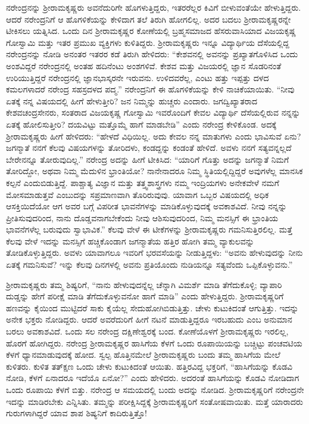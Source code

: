 ನರೇಂದ್ರನನ್ನು ಶ‍್ರೀರಾಮಕೃಷ್ಣರು ಅವನೆದುರಿಗೇ ಹೊಗಳುತ್ತಿದ್ದರು, ಇತರರೆಲ್ಲರ ಕಿವಿಗೆ ಬೀಳುವಂತೆಯೇ ಹೇಳುತ್ತಿದ್ದರು. ಆದರೆ ನರೇಂದ್ರನಿಗೆ ಆ ಹೊಗಳಿಕೆಯನ್ನು ಕೇಳಿದಾಗ ತಲೆ ತಿರುಗಿ ಹೋಗಲಿಲ್ಲ. ಅದರ ಬದಲು ಶ‍್ರೀರಾಮಕೃಷ್ಣರನ್ನೇ ಟೀಕಿಸಲು ಯತ್ನಿಸಿದ. ಒಂದು ದಿನ ಶ‍್ರೀರಾಮಕೃಷ್ಣರ ಕೋಣೆಯಲ್ಲಿ ಬ್ರಹ್ಮಸಮಾಜದ ಹೆಸರುವಾಸಿಯಾದ ವಿಜಯಕೃಷ್ಣ ಗೋಸ್ವಾಮಿ ಮತ್ತು ಇತರ ಪ್ರಮುಖ ವ್ಯಕ್ತಿಗಳು ಕುಳಿತಿದ್ದರು. ಶ‍್ರೀರಾಮಕೃಷ್ಣರು ಇನ್ನೂ ವಿದ್ಯಾರ್ಥಿಯ ದೆಸೆಯಲ್ಲಿದ್ದ ನರೇಂದ್ರನನ್ನು ನೋಡಿ ಅನಂತರ ಇತರರ ಕಡೆ ತಿರುಗಿ ಹೇಳಿದರು: “ಕೇಶವನಲ್ಲಿ ಅವನನ್ನು ಪ್ರಖ್ಯಾತಗೊಳಿಸಿದ ಒಂದು ಅಂಶವಿದ್ದರೆ ನರೇಂದ್ರನಲ್ಲಿ ಅಂತಹ ಹದಿನೆಂಟು ಅಂಶಗಳಿವೆ. ಕೇಶವ ಮತ್ತು ವಿಜಯರಲ್ಲಿ ಜ್ಞಾನ ಸೊಡರಿನಂತೆ ಉರಿಯುತ್ತಿದ್ದರೆ ನರೇಂದ್ರನಲ್ಲಿ ಜ್ಞಾನಭಾಸ್ಕರನೇ ಇರುವನು. ಉಳಿದವರೆಲ್ಲ, ಎಂಟು ಹತ್ತು ಇಪ್ಪತ್ತು ದಳದ ಕಮಲಗಳಾದರೆ ನರೇಂದ್ರ ಸಹಸ್ರದಳದ ಪದ್ಮ.” ನರೇಂದ್ರನಿಗೆ ಈ ಹೊಗಳಿಕೆಯನ್ನು ಕೇಳಿ ನಾಚಿಕೆಯಾಯಿತು. “ನೀವು ಏತಕ್ಕೆ ನನ್ನ ವಿಷಯದಲ್ಲಿ ಹೀಗೆ ಹೇಳುತ್ತೀರಿ? ಜನ ನಿಮ್ಮನ್ನು ಹುಚ್ಚರು ಎಂದಾರು. ಜಗದ್ವಿಖ್ಯಾತರಾದ ಕೇಶವಚಂದ್ರಸೇನರು, ಸಂತರಾದ ವಿಜಯಕೃಷ್ಣ ಗೋಸ್ವಾಮಿ ಇವರೊಂದಿಗೆ ಕೇವಲ ವಿದ್ಯಾರ್ಥಿ ದೆಸೆಯಲ್ಲಿರುವ ನನ್ನನ್ನು ಏತಕ್ಕೆ ಹೋಲಿಸುತ್ತೀರಿ? ದಯವಿಟ್ಟು ಮತ್ತೊಮ್ಮೆ ಹಾಗೆ ಮಾಡಬೇಡಿ” ಎಂದು ನರೇಂದ್ರ ಕೇಳಿಕೊಂಡ. ಅದಕ್ಕೆ ಶ‍್ರೀರಾಮಕೃಷ್ಣರು ಹೀಗೆ ಹೇಳಿದರು: “ಹೇಳದೆ ವಿಧಿಯಿಲ್ಲ. ಅದು ಕೇವಲ ನನ್ನ ಮಾತುಗಳು ಎಂದು ಭಾವಿಸುವೆ ಏನು? ಜಗನ್ಮಾತೆ ನನಗೆ ಕೆಲವು ವಿಷಯಗಳನ್ನು ತೋರಿದಳು, ಕಂಡದ್ದನ್ನು ಕಂಡಂತೆ ಹೇಳಿದೆ. ಅವಳು ನನಗೆ ಸತ್ಯವನ್ನಲ್ಲದೆ ಬೇರೇನನ್ನೂ ತೋರುವುದಿಲ್ಲ.” ನರೇಂದ್ರ ಅದನ್ನು ಹೀಗೆ ಟೀಕಿಸಿದ: “ಯಾರಿಗೆ ಗೊತ್ತು ಅದನ್ನು ಜಗನ್ಮಾತೆ ನಿಮಗೆ ತೋರಿದ್ದೋ, ಅಥವಾ ನಿಮ್ಮ ಮೆದುಳಿನ ಭ್ರಾಂತಿಯೋ? ನಾನೇನಾದರೂ ನಿಮ್ಮ ಸ್ಥಿತಿಯಲ್ಲಿದ್ದಿದ್ದರೆ ಅವುಗಳೆಲ್ಲ ಮಾನಸಿಕ ಕಲ್ಪನೆ ಎಂದುಬಿಡುತ್ತಿದ್ದೆ. ಪಾಶ್ಚಾತ್ಯ ವಿಜ್ಞಾನ ಮತ್ತು ತತ್ತ್ವಶಾಸ್ತ್ರಗಳು ನಮ್ಮ ಇಂದ್ರಿಯಗಳು ಅನೇಕವೇಳೆ ನಮಗೆ ಮೋಸಮಾಡುತ್ತವೆ ಎಂಬುದನ್ನು ಸಪ್ರಮಾಣವಾಗಿ ತೊರಿರುವುವು. ಯಾವಾಗ ಒಬ್ಬರ ವಿಷಯದಲ್ಲಿ ಅಧಿಕ ಆಸಕ್ತಿಯಿದೆಯೋ ಆಗ ಅವರ ಬಗ್ಗೆ ವಿಪರೀತ ಭಾವನೆಗಳನ್ನು ಮಾಡಿಕೊಳ್ಳುವುದಕ್ಕೆ ಅವಕಾಶವಿದೆ. ನೀವು ನನ್ನನ್ನು ಪ್ರೀತಿಸುವುದರಿಂದ, ನಾನು ದೊಡ್ಡವನಾಗಬೇಕೆಂದು ನೀವು ಆಶಿಸುವುದರಿಂದ, ನಿಮ್ಮ ಮನಸ್ಸಿಗೆ ಈ ಭ್ರಾಂತಿಯ ಭಾವನೆಗಳೆಲ್ಲ ಬರುವುದು ಸ್ವಾಭಾವಿಕ.” ಕೆಲವು ವೇಳೆ ಈ ಟೀಕೆಗಳನ್ನು ಶ‍್ರೀರಾಮಕೃಷ್ಣರು ಗಮನಿಸುತ್ತಿರಲಿಲ್ಲ. ಮತ್ತೆ ಕೆಲವು ವೇಳೆ ಇದನ್ನು ಮನಸ್ಸಿಗೆ ಹಚ್ಚಿಕೊಂಡಾಗ ಜಗನ್ಮಾತೆಯ ಹತ್ತಿರ ಹೋಗಿ ತಮ್ಮ ವ್ಯಾಕುಲವನ್ನು ತೋಡಿಕೊಳ್ಳುತ್ತಿದ್ದರು. ಅವಳು ಯಾವಾಗಲೂ ಇವರಿಗೆ ಭರವಸೆಯನ್ನು ನೀಡುತ್ತಿದ್ದಳು: “ಅವನು ಹೇಳುವುದನ್ನು ನೀನು ಏತಕ್ಕೆ ಗಮನಿಸುವೆ? ಇನ್ನು ಕೆಲವು ದಿನಗಳಲ್ಲಿ ಅವನು ಪ್ರತಿಯೊಂದು ನುಡಿಯನ್ನೂ ಸತ್ಯವೆಂದು ಒಪ್ಪಿಕೊಳ್ಳುವನು.”

ಶ‍್ರೀರಾಮಕೃಷ್ಣರು ತಮ್ಮ ಶಿಷ್ಯರಿಗೆ, “ನಾನು ಹೇಳುವುದನ್ನೆಲ್ಲ ಚೆನ್ನಾಗಿ ವಿಮರ್ಶೆ ಮಾಡಿ ತೆಗೆದುಕೊಳ್ಳಿ; ವ್ಯಾಪಾರಿ ದುಡ್ಡನ್ನು ಹೇಗೆ ಪರೀಕ್ಷೆ ಮಾಡಿ ತೆಗೆದುಕೊಳ್ಳುವನೋ ಹಾಗೆ ಮಾಡಿ” ಎಂದು ಹೇಳುತ್ತಿದ್ದರು. ಶ‍್ರೀರಾಮಕೃಷ್ಣರಿಗೆ ಹಣವನ್ನು ಕೈಯಿಂದ ಮುಟ್ಟಿದರೆ ಸಾಕು ಕೈಯೆಲ್ಲ ಸೇದುಹೋಗಿಬಿಡುತ್ತಿತ್ತು. ಚೇಳು ಕುಟುಕಿದಂತೆ ಆಗುತ್ತಿತ್ತು. ಇದನ್ನು ಅನೇಕ ಭಕ್ತರು ನೋಡಿದ್ದರು. ಆದರೆ ಅವರೆದುರಿಗೆ ಹೀಗೆ ನಟನೆ ಮಾಡುತ್ತಿದ್ದರೂ ಇರಬಹುದು ಎಂಬ ಅನುಮಾನ ಬರಲು ಅವಕಾಶವಿದೆ. ಒಂದು ಸಲ ನರೇಂದ್ರ ದಕ್ಷಿಣೇಶ್ವರಕ್ಕೆ ಬಂದ. ಕೋಣೆಯೊಳಗೆ ಶ‍್ರೀರಾಮಕೃಷ್ಣರು ಇರಲಿಲ್ಲ, ಹೊರಗೆ ಹೋಗಿದ್ದರು. ನರೇಂದ್ರ ಶ‍್ರೀರಾಮಕೃಷ್ಣರ ಹಾಸಿಗೆಯ ಕೆಳಗೆ ಒಂದು ರೂಪಾಯಿಯನ್ನು ಬಚ್ಚಿಟ್ಟು ಪಂಚವಟಿಯ ಕೆಳಗೆ ಧ್ಯಾನಮಾಡುವುದಕ್ಕೆ ಹೋದ. ಸ್ವಲ್ಪ ಹೊತ್ತಿನಮೇಲೆ ಶ‍್ರೀರಾಮಕೃಷ್ಣರು ಬಂದು ತಮ್ಮ ಹಾಸಿಗೆಯ ಮೇಲೆ ಕುಳಿತರು. ಕುಳಿತ ತತ್‍ಕ್ಷಣ ಒಂದು ಚೇಳು ಕುಟುಕಿದಂತೆ ಆಯಿತು. ಹತ್ತಿರವಿದ್ದ ಭಕ್ತರಿಗೆ, “ಹಾಸಿಗೆಯನ್ನು ಕೊಡವಿ ನೋಡಿ, ಕೆಳಗೆ ಏನಾದರೂ ಇದೆಯೊ ಏನೋ?” ಎಂದು ಹೇಳಿದರು. ಅದರಂತೆ ಹಾಸಿಗೆಯನ್ನು ಕೊಡವಿ ನೋಡಿದಾಗ ಒಂದು ರೂಪಾಯಿ ಕೆಳಗೆ ಬಿತ್ತು. ನರೇಂದ್ರ ಆ ಸಮಯದಲ್ಲಿ ಬಂದು ಅದನ್ನು ನೋಡಿದ. ಶ‍್ರೀರಾಮಕೃಷ್ಣರಿಗೆ ನರೇಂದ್ರನೇ ಇದನ್ನು ಮಾಡಿರಬೇಕು ಎನ್ನಿಸಿತು. ತಮ್ಮನ್ನು ಪರೀಕ್ಷಿಸಿದ್ದಕ್ಕೆ ಶ‍್ರೀರಾಮಕೃಷ್ಣರಿಗೆ ಸಂತೋಷವಾಯಿತು. ಮತ್ತೆ ಯಾರಾದರು ಗುರುಗಳಾಗಿದ್ದರೆ ಯಾವ ಶಾಪ ಶಿಷ್ಯನಿಗೆ ಕಾದಿರುತ್ತಿತ್ತೊ!

